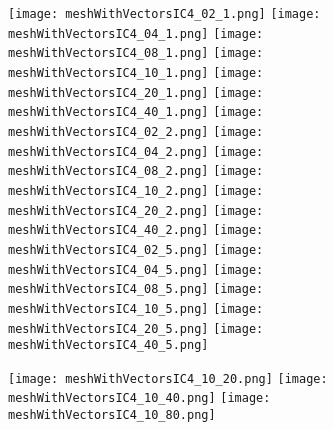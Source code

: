 \documentclass{InsightArticle}
\begin{document}
\begin{figure}
\center
\texttt{[image: meshWithVectorsIC4\_02\_1.png]}
\texttt{[image: meshWithVectorsIC4\_04\_1.png]}
\texttt{[image: meshWithVectorsIC4\_08\_1.png]}
\texttt{[image: meshWithVectorsIC4\_10\_1.png]}
\texttt{[image: meshWithVectorsIC4\_20\_1.png]}
\texttt{[image: meshWithVectorsIC4\_40\_1.png]}
\texttt{[image: meshWithVectorsIC4\_02\_2.png]}
\texttt{[image: meshWithVectorsIC4\_04\_2.png]}
\texttt{[image: meshWithVectorsIC4\_08\_2.png]}
\texttt{[image: meshWithVectorsIC4\_10\_2.png]}
\texttt{[image: meshWithVectorsIC4\_20\_2.png]}
\texttt{[image: meshWithVectorsIC4\_40\_2.png]}
\texttt{[image: meshWithVectorsIC4\_02\_5.png]}
\texttt{[image: meshWithVectorsIC4\_04\_5.png]}
\texttt{[image: meshWithVectorsIC4\_08\_5.png]}
\texttt{[image: meshWithVectorsIC4\_10\_5.png]}
\texttt{[image: meshWithVectorsIC4\_20\_5.png]}
\texttt{[image: meshWithVectorsIC4\_40\_5.png]}
\label{fig:VectorIC4Smoothings}
\end{figure}

\clearpage

\begin{figure}
\center
\texttt{[image: meshWithVectorsIC4\_10\_20.png]}
\texttt{[image: meshWithVectorsIC4\_10\_40.png]}
\texttt{[image: meshWithVectorsIC4\_10\_80.png]}
\label{fig:VectorIC4StrongSmoothings}
\end{figure}





%
%



\end{document}
